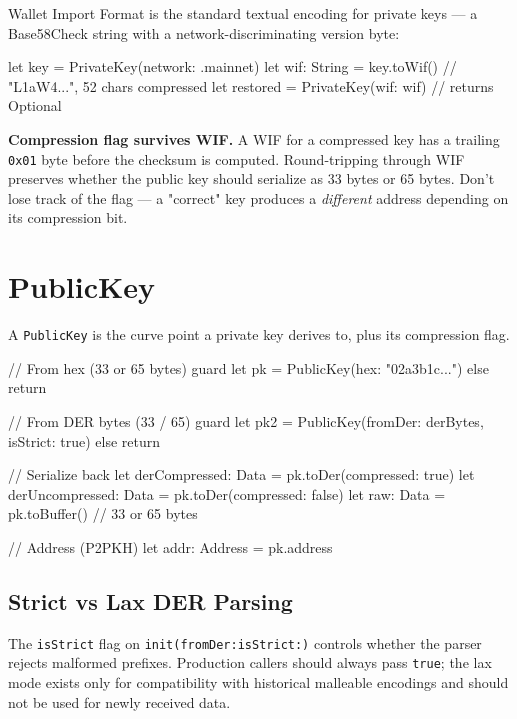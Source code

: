 \documentclass[a4paper, 11pt, openany]{book}
\begin{document}
Wallet Import Format is the standard textual encoding for private keys --- a Base58Check string with a network-discriminating version byte:

\begin{forthbox}
let key = PrivateKey(network: .mainnet)
let wif: String = key.toWif()          // "L1aW4...", 52 chars compressed
let restored = PrivateKey(wif: wif)    // returns Optional
\end{forthbox}

\begin{notebox}
\textbf{Compression flag survives WIF.} A WIF for a compressed key has a trailing \texttt{0x01} byte before the checksum is computed. Round-tripping through WIF preserves whether the public key should serialize as 33 bytes or 65 bytes. Don't lose track of the flag --- a "correct" key produces a \emph{different} address depending on its compression bit.
\end{notebox}

\section{PublicKey}

A \texttt{PublicKey} is the curve point a private key derives to, plus its compression flag.

\begin{forthbox}
// From hex (33 or 65 bytes)
guard let pk = PublicKey(hex: "02a3b1c...") else { return }

// From DER bytes (33 / 65)
guard let pk2 = PublicKey(fromDer: derBytes, isStrict: true) else {
    return
}

// Serialize back
let derCompressed: Data   = pk.toDer(compressed: true)
let derUncompressed: Data = pk.toDer(compressed: false)
let raw: Data             = pk.toBuffer()  // 33 or 65 bytes

// Address (P2PKH)
let addr: Address = pk.address
\end{forthbox}

\subsection{Strict vs Lax DER Parsing}

The \texttt{isStrict} flag on \texttt{init(fromDer:isStrict:)} controls whether the parser rejects malformed prefixes. Production callers should always pass \texttt{true}; the lax mode exists only for compatibility with historical malleable encodings and should not be used for newly received data.
\end{document}
